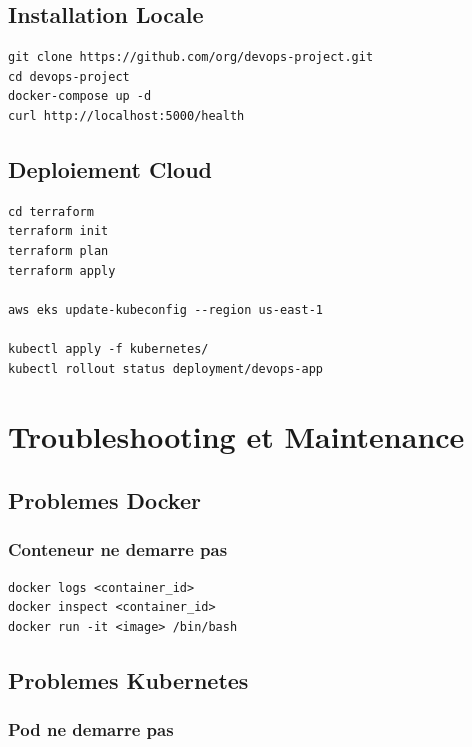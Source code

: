\documentclass[12pt,a4paper]{report}
\begin{document}
\section{Installation Locale}

\begin{lstlisting}
git clone https://github.com/org/devops-project.git
cd devops-project
docker-compose up -d
curl http://localhost:5000/health
\end{lstlisting}

\section{Deploiement Cloud}

\begin{lstlisting}
cd terraform
terraform init
terraform plan
terraform apply

aws eks update-kubeconfig --region us-east-1

kubectl apply -f kubernetes/
kubectl rollout status deployment/devops-app
\end{lstlisting}

\newpage

\chapter{Troubleshooting et Maintenance}

\section{Problemes Docker}

\subsection{Conteneur ne demarre pas}

\begin{lstlisting}
docker logs <container_id>
docker inspect <container_id>
docker run -it <image> /bin/bash
\end{lstlisting}

\section{Problemes Kubernetes}

\subsection{Pod ne demarre pas}
\end{document}
